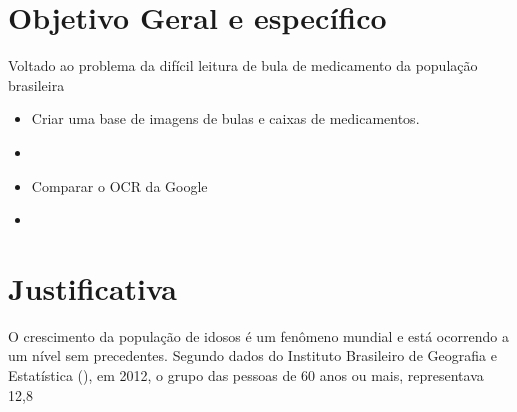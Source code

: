\section{Objetivo Geral e específico}
Voltado ao problema da difícil leitura de bula  de medicamento da população brasileira %

\begin{itemize}
  \item Criar uma base de imagens de bulas e caixas de medicamentos.
  \item %
  \item Comparar o OCR da Google %
  \item %
\end{itemize}



\section{Justificativa}
O crescimento da população de idosos é um fenômeno mundial e está ocorrendo a um nível sem precedentes. Segundo dados do Instituto Brasileiro de Geografia e Estatística (), em 2012, o grupo das pessoas de 60 anos ou mais, representava 12,8%


